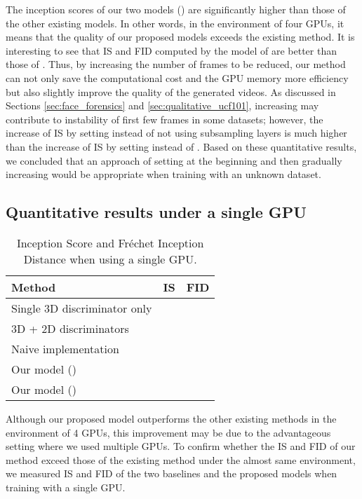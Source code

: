 \documentclass[twocolumn]{svjour3}
\begin{document}
The inception scores of our two models () are
significantly higher than those of the other existing models.
In other words, in the environment of four GPUs,
it means that the quality of our proposed models exceeds the existing method.
It is interesting to see that IS and FID computed by the model of 
are better than those of .
Thus, by increasing the number of frames to be reduced,
our method can not only save the computational cost and the GPU memory more efficiency
but also slightly improve the quality of the generated videos.
As discussed in Sections \ref{sec:face_forensics} and \ref{sec:qualitative_ucf101},
increasing  may contribute to instability of first few frames in some datasets;
however, the increase of IS by setting  instead of not using subsampling layers
is much higher than the increase of IS by setting  instead of .
Based on these quantitative results, we concluded that an approach of setting
 at the beginning and then gradually increasing would be appropriate
when training with an unknown dataset.

\subsection{Quantitative results under a single GPU}
\label{sec:single_gpu_exp}
\begin{table}[t]
\centering
{\renewcommand{\arraystretch}{1.2}
\begin{tabular}{lll}
Method & IS & FID \\ \hline \hline
Single 3D discriminator only &  &  \\
3D + 2D discriminators &  &  \\
Naive implementation &  &  \\ \hline
Our model () &  &  \\
Our model () &  &  \\ \hline
\end{tabular}
}
\caption{Inception Score and Fr\'echet Inception Distance when using a single GPU.}
\label{table:is_single_gpu}
\vspace{-10pt}
\end{table}






Although our proposed model outperforms the other existing methods
in the environment of 4 GPUs, this improvement may be due to
the advantageous setting where we used multiple GPUs.
To confirm whether the IS and FID of our method exceed
those of the existing method under the almost same environment,
we measured IS and FID of the two baselines and the proposed models
when training with a single GPU.
\end{document}
